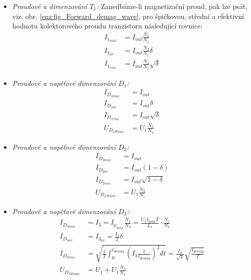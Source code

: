       \begin{itemize}
        \item \emph{Proudové a dimenzování $T_1$:}
           \newline Zanedbáme-li magnetizační proud, pak lze psát, viz. obr.
           \ref{enz:fig_Forward_demag_wave}, pro špičkovou, střední a efektivní hodnotu
           kolektorového proudu tranzistoru následující rovnice:
            \begin{align}
                I_{1_{max}} &= I_{out}\frac{N_2}{N_1}             \\
                I_{1_{av}}  &= I_{out}\frac{N_2}{N_1}\delta       \\
                I_{1_{rms}} &= I_{out}\frac{N_2}{N_1}\sqrt{\delta}
            \end{align}
        \item \emph{Proudové a napěťové dimenzování $D_1$:}
            \begin{align}
                I_{D_{1max}} &= I_{out}                \\
                I_{D_{1av}}  &= I_{out}\delta          \\
                I_{D_{1rms}} &= I_{out}\sqrt{\delta}   \\
                U_{D_{1Rmax}}&= U_1\frac{N_2}{N_3}
            \end{align}
        \item \emph{Proudové a napěťové dimenzování $D_2$:}
            \begin{align}
                I_{D_{2max}} &= I_{out}                \\
                I_{D_{2av}}  &= I_{out}(1-\delta)      \\
                I_{D_{2rms}} &= I_{out}\sqrt{1-\delta} \\
                U_{D_{2Rmax}}&= U_1\frac{N_2}{N_1}
            \end{align}
        \item \emph{Proudové a napěťové dimenzování $D_3$:}
            \begin{align}
                I_{D_{3max}} &= I_3        = I_{\mu_{max}}\frac{N_1}{N_3} =
                                             \frac{U_1\delta_{max}T}{L_1}\cdot\frac{N_1}{N_3}   \\
                I_{D_{3av}}  &= I_{3_{av}} = \frac{I_3}{2}\delta                                \\
                I_{D_{3rms}} &=  \sqrt{\frac{1}{T}\int_0^{t_{demag}}
                                {\left(I_3\frac{t}{t_{demag}}\right)^2}dt} =
                                 \frac{I_3}{\sqrt{3}}\sqrt{\frac{t_{demag}}{T}}                 \\
                U_{D_{3Rmax}}&= U_1 + U_1\frac{N_3}{N_1}
            \end{align}
      \end{itemize}
